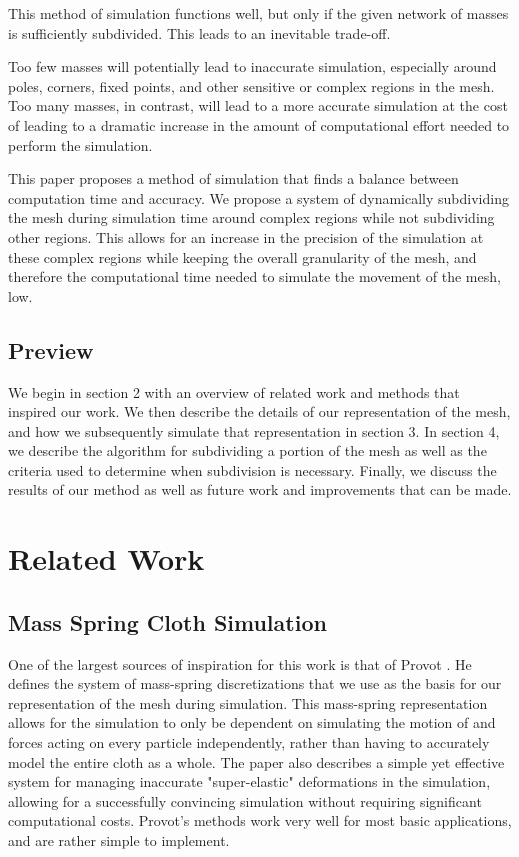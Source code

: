 \documentclass[sigconf]{acmart}
\begin{document}
This method of simulation functions
well, but only if the given network of masses is sufficiently subdivided. This leads to an inevitable trade-off.

Too few masses will potentially lead to inaccurate simulation, especially around poles, corners, fixed points,
and other sensitive or complex regions in the mesh. Too many masses, in contrast, will lead to a more accurate simulation
at the cost of leading to a dramatic increase in the amount of computational effort needed to perform the simulation.

This paper proposes a method of simulation that finds a balance between computation time and accuracy. We propose a
system of dynamically subdividing the mesh during simulation time around complex regions while not subdividing other regions. This allows for an increase in the precision of the simulation at these complex regions while keeping
the overall granularity of the mesh, and therefore the computational time needed to simulate the movement of the mesh, low. 
\subsection{Preview}
We begin in section 2 with an overview of related work and methods that inspired our work. We then describe the details of our representation of the mesh, and how we subsequently simulate that representation in section 3. In section 4, we describe the algorithm for subdividing a portion of the mesh as well as the criteria used to determine when subdivision is necessary. Finally, we discuss the results of our method as well as future work and improvements that can be made.
\section{Related Work}
\subsection{Mass Spring Cloth Simulation}
One of the largest sources of inspiration for this work is that of Provot \cite{provot}. He defines the system of mass-spring discretizations that we use as the basis for our representation of the mesh during simulation. This mass-spring representation allows for the simulation to only be dependent on simulating the motion of and forces acting on every particle independently, rather than having to accurately model the entire cloth as a whole. The paper also describes a simple yet effective system for managing inaccurate "super-elastic" deformations in the simulation, allowing for a successfully convincing simulation without requiring significant computational costs. Provot's methods work very well for most basic applications, and are rather simple to implement. 
\end{document}
